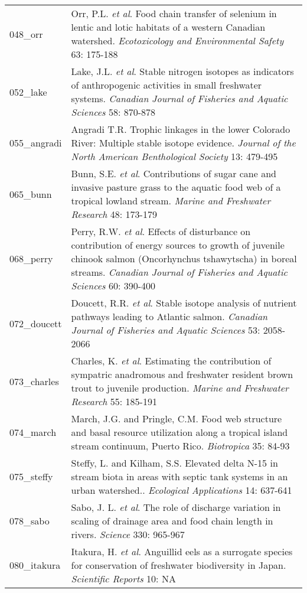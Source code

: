 \begin{longtable}{p{}p{}}
  048_orr & Orr, P.L. \textit{et al}. Food chain transfer of selenium in lentic and lotic habitats of a western Canadian watershed. \textit{Ecotoxicology and Environmental Safety} 63: 175-188 \\ 
  052_lake & Lake, J.L. \textit{et al}. Stable nitrogen isotopes as indicators of anthropogenic activities in small freshwater systems. \textit{Canadian Journal of Fisheries and Aquatic Sciences} 58: 870-878 \\ 
  055_angradi & Angradi T.R. Trophic linkages in the lower Colorado River: Multiple stable isotope evidence. \textit{Journal of the North American Benthological Society} 13: 479-495 \\ 
  065_bunn & Bunn, S.E. \textit{et al}. Contributions of sugar cane and invasive pasture grass to the aquatic food web of a tropical lowland stream. \textit{Marine and Freshwater Research} 48: 173-179 \\ 
  068_perry & Perry, R.W. \textit{et al}. Effects of disturbance on contribution of energy sources to growth of juvenile chinook salmon (Oncorhynchus tshawytscha) in boreal streams. \textit{Canadian Journal of Fisheries and Aquatic Sciences} 60: 390-400 \\ 
  072_doucett & Doucett, R.R. \textit{et al}. Stable isotope analysis of nutrient pathways leading to Atlantic salmon. \textit{Canadian Journal of Fisheries and Aquatic Sciences} 53: 2058-2066 \\ 
  073_charles & Charles, K. \textit{et al}. Estimating the contribution of sympatric anadromous and freshwater resident brown trout to juvenile production. \textit{Marine and Freshwater Research} 55: 185-191 \\ 
  074_march & March, J.G. and Pringle, C.M. Food web structure and basal resource utilization along a tropical island stream continuum, Puerto Rico. \textit{Biotropica} 35: 84-93 \\ 
  075_steffy & Steffy, L. and Kilham, S.S. Elevated delta N-15 in stream biota in areas with septic tank systems in an urban watershed.. \textit{Ecological Applications} 14: 637-641 \\ 
  078_sabo & Sabo, J. L. \textit{et al}. The role of discharge variation in scaling of drainage area and food chain length in rivers. \textit{Science} 330: 965-967 \\ 
  080_itakura & Itakura, H. \textit{et al}. Anguillid eels as a surrogate species for conservation of freshwater biodiversity in Japan. \textit{Scientific Reports} 10: NA \\ 

\end{longtable}
